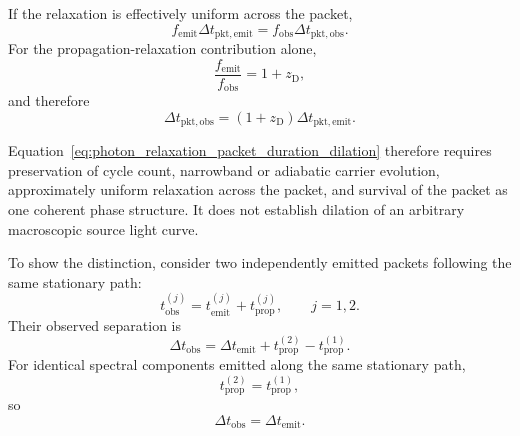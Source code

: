 If the relaxation is effectively uniform across the packet,
\begin{equation}
    f_{\mathrm{emit}}
    \Delta t_{\mathrm{pkt,emit}}
    =
    f_{\mathrm{obs}}
    \Delta t_{\mathrm{pkt,obs}}.
    \label{eq:photon_relaxation_packet_cycle_balance}
\end{equation}
For the propagation-relaxation contribution alone,
\begin{equation}
    \frac{
        f_{\mathrm{emit}}
    }{
        f_{\mathrm{obs}}
    }
    =
    1+z_{\mathrm D},
    \label{eq:photon_relaxation_frequency_redshift}
\end{equation}
and therefore
\begin{equation}
    \Delta t_{\mathrm{pkt,obs}}
    =
    \left(
        1+z_{\mathrm D}
    \right)
    \Delta t_{\mathrm{pkt,emit}}.
    \label{eq:photon_relaxation_packet_duration_dilation}
\end{equation}

Equation~\eqref{eq:photon_relaxation_packet_duration_dilation} therefore
requires preservation of cycle count, narrowband or adiabatic carrier
evolution, approximately uniform relaxation across the packet, and survival
of the packet as one coherent phase structure. It does not establish dilation
of an arbitrary macroscopic source light curve.

To show the distinction, consider two independently emitted packets following
the same stationary path:
\begin{equation}
    t_{\mathrm{obs}}^{(j)}
    =
    t_{\mathrm{emit}}^{(j)}
    +
    t_{\mathrm{prop}}^{(j)},
    \qquad
    j
    =
    1,2.
    \label{eq:photon_relaxation_two_packet_arrivals}
\end{equation}
Their observed separation is
\begin{equation}
    \Delta t_{\mathrm{obs}}
    =
    \Delta t_{\mathrm{emit}}
    +
    t_{\mathrm{prop}}^{(2)}
    -
    t_{\mathrm{prop}}^{(1)}.
    \label{eq:photon_relaxation_arrival_interval_general}
\end{equation}
For identical spectral components emitted along the same stationary path,
\begin{equation}
    t_{\mathrm{prop}}^{(2)}
    =
    t_{\mathrm{prop}}^{(1)},
    \label{eq:photon_relaxation_equal_stationary_path_times}
\end{equation}
so
\begin{equation}
    \Delta t_{\mathrm{obs}}
    =
    \Delta t_{\mathrm{emit}}.
    \label{eq:photon_relaxation_no_automatic_envelope_dilation}
\end{equation}

